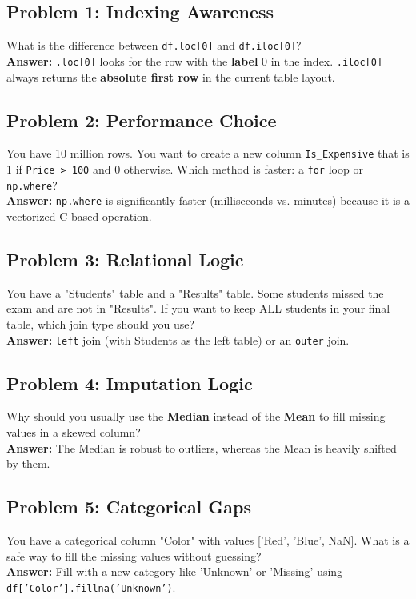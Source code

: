 \documentclass{article}
\begin{document}
\subsection{Problem 1: Indexing Awareness}
What is the difference between \texttt{df.loc[0]} and \texttt{df.iloc[0]}? \\
\textbf{Answer:} \texttt{.loc[0]} looks for the row with the \textbf{label} 0 in the index. \texttt{.iloc[0]} always returns the \textbf{absolute first row} in the current table layout.

\subsection{Problem 2: Performance Choice}
You have 10 million rows. You want to create a new column \texttt{Is\_Expensive} that is 1 if \texttt{Price > 100} and 0 otherwise. Which method is faster: a \texttt{for} loop or \texttt{np.where}? \\
\textbf{Answer:} \texttt{np.where} is significantly faster (milliseconds vs. minutes) because it is a vectorized C-based operation.

\subsection{Problem 3: Relational Logic}
You have a "Students" table and a "Results" table. Some students missed the exam and are not in "Results". If you want to keep ALL students in your final table, which join type should you use? \\
\textbf{Answer:} \texttt{left} join (with Students as the left table) or an \texttt{outer} join.

\subsection{Problem 4: Imputation Logic}
Why should you usually use the \textbf{Median} instead of the \textbf{Mean} to fill missing values in a skewed column? \\
\textbf{Answer:} The Median is robust to outliers, whereas the Mean is heavily shifted by them.

\subsection{Problem 5: Categorical Gaps}
You have a categorical column "Color" with values ['Red', 'Blue', NaN]. What is a safe way to fill the missing values without guessing? \\
\textbf{Answer:} Fill with a new category like 'Unknown' or 'Missing' using \texttt{df['Color'].fillna('Unknown')}.
\end{document}
